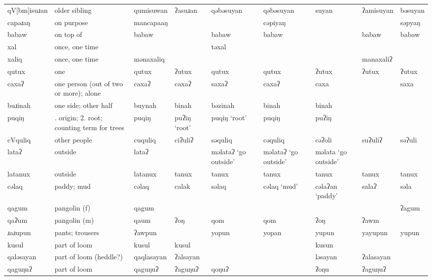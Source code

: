 \begin{landscape}
\begin{longtable}{*{9}{>{\raggedright\arraybackslash}p{}}}
\text{*}qV[bm]isuɹan & older sibling & qumisuwan & ʔasuɹan & qəbəsuyan & qəbəsuyan & suyan & ʔamisuyan & bəsuyan\\
\text{*}capəɹaŋ     & on purpose & mancapaaŋ &  &  & cəpiyaŋ &  &  & səpyaŋ\\
\text{*}babaw        & on top of & babaw &  & babaw & babaw &  & babaw & babaw\\
\text{*}xal         & once, one time &  &  & təxal &  &  &  & \\
\text{*}xaliq       & once, one time & mənaxaliq &  &  &  &  & manaxaliʔ & \\
\text{*}qutux        & one & qutux & ʔutux & qutux & qutux & ʔutux & ʔutux & ʔutux\\
\text{*}caxaʔ        & one person (out of two or more); alone & caxaʔ & caxaʔ & saxaʔ & caxaʔ & caxa &  & saxa\\
\text{*}buɹinah      & one side; other half & buynah & binah & bəzinah & binah & binah &  & \\
\text{*}puqiŋ        & 1. origin; 2. root; counting term for trees & puqiŋ & puʔiŋ `root' & puqiŋ `root' & puqiŋ & puʔiŋ &  & \\
\text{*}cVquliq      & other people & cuquliq & ciʔuliʔ & səquliq & cəquliq & cəʔoli & suʔuliʔ & səʔuli\\
\text{*}lataʔ        & outside & lataʔ &  & məlataʔ \newline `go outside' & məlataʔ \newline `go outside' & məlata \newline `go outside' &  & \\
\text{*}latanux      & outside & latanux & tanux & tanux & tanux & tanux & tanux & tanux\\
\text{*}cəlaq        & paddy; mud & cəlaq & calak & səlaq & cəlaq `mud' & cəlaʔan `paddy' & salaʔ & səla\\
\text{*}qagum        & pangolin (f) & qagum &  &  &  &  &  & ʔagum\\
\text{*}qaʔum        & pangolin (m) & qaum & ʔoŋ & qom & qom & ʔoŋ & ʔawm & \\
\text{*}ɹaɹupun      & pants; trousers & ʔawpun &  & yopun & yopan & yupun & yayupun & yupun\\
\text{*}kusul        & part of loom & kusul & kusul &  &  & kusun &  & \\
\text{*}qaləsayan    & part of loom (heddle?) & qaqlasayan & ʔalsayan &  &  & ləsayan & ʔalasayan & \\
\text{*}qaguŋuʔ      & part of loom & qaguŋuʔ & ʔaguŋuʔ & qoŋuʔ &  & ʔoŋu & ʔaguŋuʔ & \\

\end{longtable}
\end{landscape}

